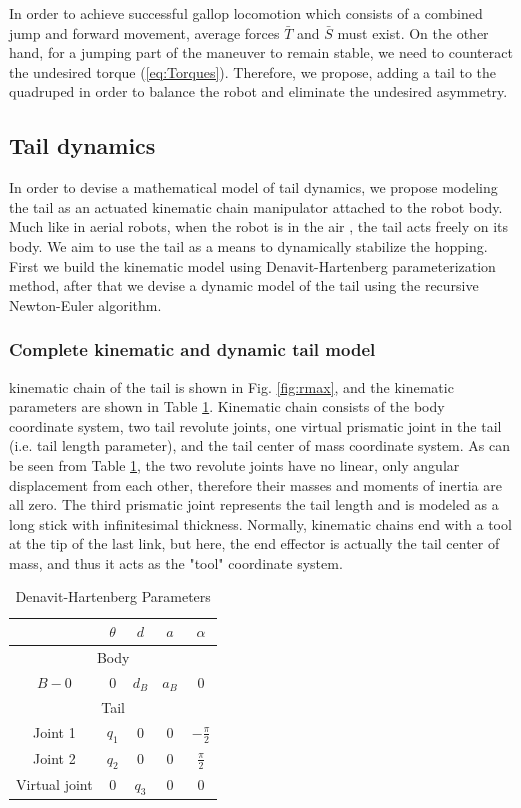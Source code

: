 In order to achieve successful gallop locomotion which consists of a combined jump and forward movement, average forces $\bar{T}$ and $\bar{S}$ must exist. On the other hand, for a jumping part of the maneuver to remain stable, we need to counteract the undesired torque (\ref{eq:Torques}). Therefore, we propose, adding a tail to the quadruped in order to balance the robot and eliminate the undesired asymmetry. 

\subsection{Tail dynamics}
In order to devise a mathematical model of tail dynamics, we propose modeling the tail as an actuated kinematic chain manipulator attached to the robot body. Much like in aerial robots, when the robot is in the air \cite{Korpela2013ICRA,Orsag2012JINT}, the tail acts freely on its body. We aim to use the tail as a means to dynamically stabilize the hopping. First we build the kinematic model using Denavit-Hartenberg parameterization method, after that we devise a dynamic model of the tail using the recursive Newton-Euler algorithm.
\subsubsection{Complete kinematic and dynamic tail model}
kinematic chain of the tail is shown in Fig. \ref{fig:rmax}, and the kinematic parameters are shown in Table \ref{tab:DHParameters}. Kinematic chain consists of the body coordinate system, two tail revolute joints, one virtual prismatic joint in the tail (i.e. tail length parameter), and the tail center of mass coordinate system. As can be seen from Table \ref{tab:DHParameters}, the two revolute joints have no linear, only angular displacement from each other, therefore their masses and moments of inertia are all zero. The third prismatic joint represents the tail length and is modeled as a long stick with infinitesimal thickness. Normally, kinematic chains end with a tool at the tip of the last link, but here, the end effector is actually the tail center of mass, and thus it acts as the "tool" coordinate system.

\begin{table}
	\centering
		\begin{tabular}{ccccc}
		\hline
			& $\theta$ & $d$ & $a$ & $\alpha$ \\\hline
			\multicolumn{5}{c}{Body}\\\hline
			$B-0$ & $0$ & $d_B$ & $a_B$ & $0$\\\hline
			\multicolumn{5}{c}{Tail}\\\hline
			Joint 1 & $q_1$ & $0$ & $0$ & $-\frac{\pi}{2}$\\
			Joint 2 & $q_2$ & $0$ & $0$ & $\frac{\pi}{2}$\\
			Virtual joint& $0$ & $q_3$ & $0$ & $0$\\\hline
		\end{tabular}
	\caption{Denavit-Hartenberg Parameters}\label{tab:DHParameters}
\end{table}


